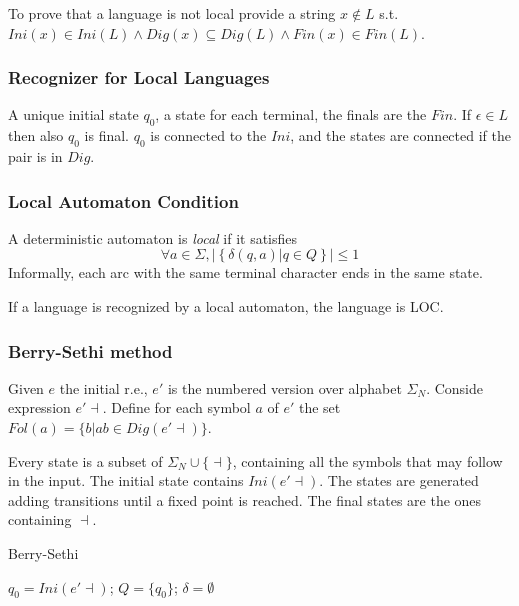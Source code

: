 To prove that a language is not local provide a string $x\notin L$ s.t. $Ini(x) \in Ini(L) \land Dig(x) \subseteq Dig(L) \land Fin(x) \in Fin(L)$.

\subsubsection{Recognizer for Local Languages}

A unique initial state $q_0$, a state for each terminal, the finals are the $Fin$. If $\epsilon \in L$ then also $q_0$ is final. $q_0$ is connected to the $Ini$, and the states are connected if the pair is in $Dig$.

\subsubsection{Local Automaton Condition}
A deterministic automaton is \emph{local} if it satisfies
\begin{equation*}
    \forall a \in \Sigma, | \left\{ \delta(q, a) | q \in Q \right\} | \le 1
\end{equation*}
Informally, each arc with the same terminal character ends in the same state.

If a language is recognized by a local automaton, the language is LOC.

\subsubsection{Berry-Sethi method}

Given $e$ the initial r.e., $e'$ is the numbered version over alphabet $\Sigma_N$. Conside expression $e' \dashv$. Define for each symbol $a$ of $e'$ the set $Fol(a) = \{b | ab \in Dig(e'\dashv)\}$.

Every state is a subset of $\Sigma_N \cup \{\dashv\}$, containing all the symbols that may follow in the input. The initial state contains $Ini(e'\dashv)$. The states are generated adding transitions until a fixed point is reached. The final states are the ones containing $\dashv$.

\begin{algorithm*}[H]
    \caption{Berry-Sethi}
    \SetAlgoLined
    $q_0 = Ini(e'\dashv)$;
    $Q = \{q_0\}$;
    $\delta=\emptyset$\;
\end{algorithm*}
